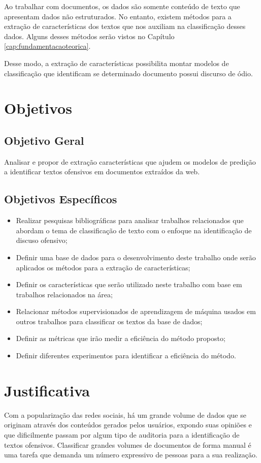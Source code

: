 Ao trabalhar com documentos, os dados são somente conteúdo de texto que apresentam dados não estruturados. No entanto, existem métodos para a extração de características dos textos que nos auxiliam na classificação desses dados. Alguns desses métodos serão vistos no Capítulo \ref{cap:fundamentacaoteorica}.
 
Desse modo, a extração de características possibilita montar modelos de classificação que identificam se determinado documento possui discurso de ódio.

\section{Objetivos}
\subsection{Objetivo Geral}
Analisar e propor de extração características que ajudem os modelos  de predição a identificar textos ofensivos em documentos extraídos da web.

\subsection{Objetivos Específicos}

\begin{itemize}
\setlength\itemsep{1em}
    \item Realizar pesquisas bibliográficas para analisar trabalhos relacionados que abordam o tema de classificação de texto com o enfoque na identificação de discuso ofensivo;
    \item Definir uma base de dados para o desenvolvimento deste trabalho onde serão aplicados os métodos para a extração de características;
    \item Definir os características que serão utilizado neste trabalho com base em trabalhos relacionados na área;
    \item Relacionar métodos supervisionados de aprendizagem de máquina usados em outros trabalhos para classificar os textos da base de dados;
    \item Definir as métricas que irão medir a eficiência do método proposto;
    \item Definir diferentes experimentos para identificar a eficiência do método.
\end{itemize}

\section{Justificativa}
Com a popularização das redes sociais, há um grande volume de dados que se originam através dos conteúdos gerados pelos usuários, expondo suas opiniões e que dificilmente passam por algum tipo de auditoria para a identificação de textos ofensivos. Classificar grandes volumes de documentos de forma manual é uma tarefa que demanda um número expressivo de pessoas para a sua realização.

